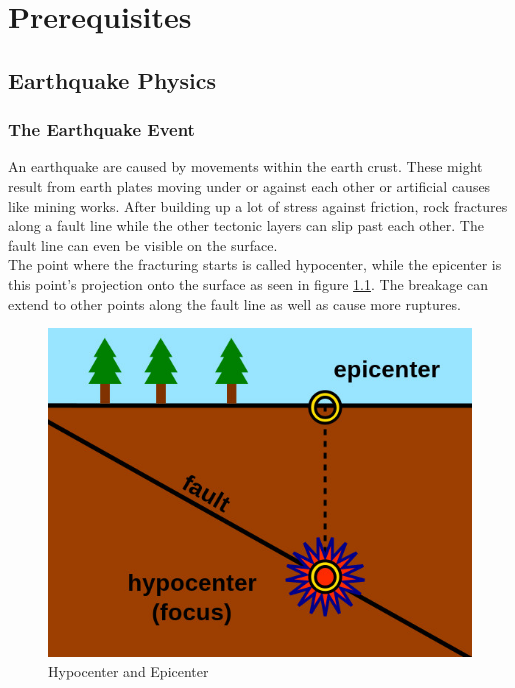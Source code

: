 \documentclass[thesis.tex]{subfiles}
\begin{document}
\chapter{Prerequisites}\label{chap:preq}

\section{Earthquake Physics}\label{section:geophysikalische_grundlagen}
\subsection{The Earthquake Event}
An earthquake are caused by movements within the earth crust. These might result from earth plates moving under or against each other or artificial causes like mining works. After building up a lot of stress against friction, rock fractures along a fault line while the other tectonic layers can slip past each other. The fault line can even be visible on the surface. \\
The point where the fracturing starts is called hypocenter, while the epicenter is this point's projection onto the surface as seen in figure \ref{fig:hypocenter}. The breakage can extend to other points along the fault line as well as cause more ruptures.
\begin{figure}[hb]
	\centering
	\includegraphics[width=0.6\linewidth]{../pictures/Prerequisites/Epicenter_Diagram.jpg}
	\caption{Hypocenter and Epicenter}
	\label{fig:hypocenter}
\end{figure}
\end{document}
